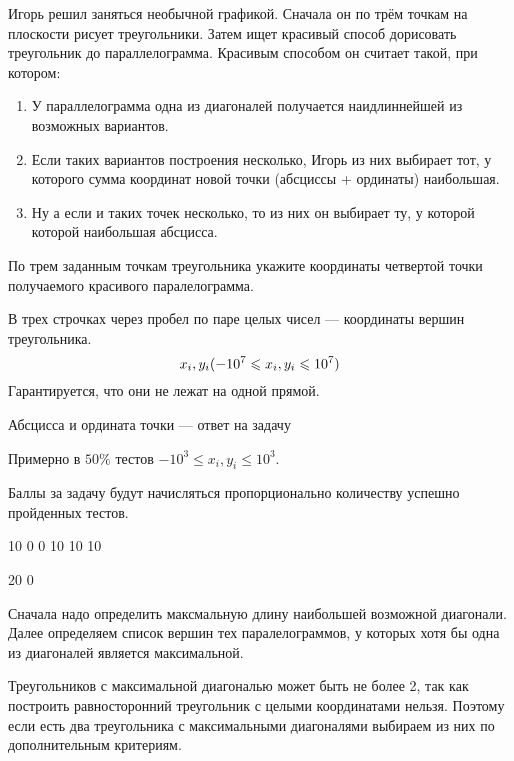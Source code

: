 
Игорь решил заняться необычной графикой. Сначала он по трём точкам на плоскости рисует треугольники. Затем ищет красивый способ дорисовать треугольник до параллелограмма. Красивым способом он считает такой, при котором:

\begin{enumerate}
\item У параллелограмма одна из диагоналей получается наидлиннейшей из возможных вариантов. 
\item Если таких вариантов построения несколько, Игорь из них выбирает тот, у которого сумма координат новой точки (абсциссы + ординаты) наибольшая. 
\item Ну а если и таких точек несколько, то из них он выбирает ту, у которой которой наибольшая абсцисса.
\end{enumerate}

По трем заданным точкам треугольника укажите координаты четвертой точки получаемого красивого паралелограмма.


В трех строчках через пробел по паре целых чисел — координаты вершин треугольника. $$ x_i, y_i\space (-10^7\leq x_i, y_i \leq 10^7) $$ Гарантируется, что они не лежат на одной прямой.

\outputfmtSection

Абсцисса и ордината точки — ответ на задачу

\markSection

Примерно в $ 50\% $ тестов $ -10^3 \leq x_i, y_i \leq 10^3 $.

Баллы за задачу будут начисляться пропорционально количеству успешно пройденных тестов.


\begin{myverbbox}[\small]{\vinput}
    10 0 0 10 10 10
\end{myverbbox}

\begin{myverbbox}[\small]{\voutput}
    20 0
\end{myverbbox}

\solutionSection

Сначала надо определить максмальную длину наибольшей возможной диагонали. Далее определяем список вершин тех паралелограммов, у которых хотя бы одна из диагоналей является максимальной. 

Треугольников с максимальной диагональю может быть не более 2, так как построить равносторонний треугольник с целыми координатами нельзя. Поэтому если есть два треугольника с максимальными диагоналями выбираем из них по дополнительным критериям. 

